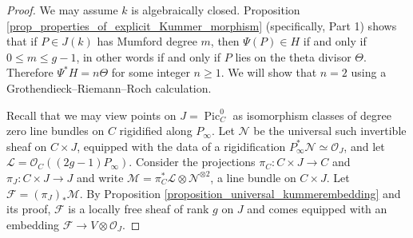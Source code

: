 \documentclass{article} %
\numberwithin{equation}{section}
\DeclareMathOperator{\Pic}{Pic}
\newcommand{\sh}[1]{\mathscr{#1}}
\renewcommand{\O}{\mathcal{O}}
\begin{document}
\begin{proof}
    We may assume $k$ is algebraically closed.
    Proposition \ref{prop_properties_of_explicit_Kummer_morphism} (specifically, Part 1) shows that if $P\in J(k)$ has Mumford degree $m$, then $\Psi(P) \in H$ if and only if $0\leq m \leq g-1$, in other words if and only if $P$ lies on the theta divisor $\Theta$.
    Therefore $\Psi^*H = n \Theta$ for some integer $n\geq 1$.
    We will show that $n = 2$ using a Grothendieck--Riemann--Roch calculation.

    Recall that we may view points on $J = \Pic^0_C$ as isomorphism classes of degree zero line bundles on $C$ rigidified along $P_{\infty}$. 
    Let $\sh{N}$ be the universal such invertible sheaf on $C\times J$, equipped with the data of a rigidification $P_{\infty}^* \sh{N} \simeq \O_J$, and let $\sh{L} = \O_C((2g-1)P_{\infty})$.
    Consider the projections $\pi_C\colon C\times J \rightarrow C$ and $\pi_J\colon C\times J\rightarrow J$ and write $\sh{M} = \pi_C^*\sh{L} \otimes \sh{N}^{\otimes 2}$, a line bundle on $C\times J$.
    Let $\sh{F} = (\pi_{J})_*\sh{M}$.
    By Proposition \ref{proposition_universal_kummerembedding} and its proof, $\sh{F}$ is a locally free sheaf of rank $g$ on $J$ and comes equipped with an embedding $\sh{F}\rightarrow V \otimes \O_J$.
    


\end{proof}
\end{document}
